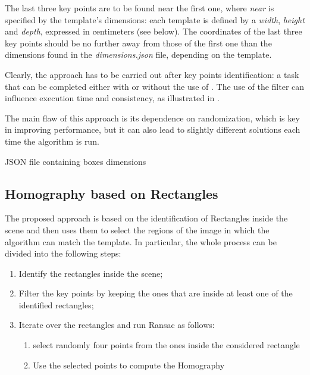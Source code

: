 \documentclass{article}
\newenvironment{code}{\captionsetup{type=listing}}{}
\begin{document}
The last three key points are to be found near the first one, where \textit{near} is specified by the template's dimensions: each template is defined by a \textit{width}, \textit{height} and \textit{depth}, expressed in centimeters (see below). The coordinates of the last three key points should be no further away from those of the first one than the dimensions found in the \textit{dimensions.json} file, depending on the template.

Clearly, the approach has to be carried out after key points identification: a task that can be completed either with or without the use of . The use of the filter can influence execution time and consistency, as illustrated in .

The main flaw of this approach is its dependence on randomization, which is key in improving performance, but it can also lead to slightly different solutions each time the algorithm is run.\\


\begin{code}
    \caption{JSON file containing boxes dimensions}
\end{code}

\subsection{Homography based on Rectangles}
The proposed approach is based on the identification of Rectangles inside the scene and then uses them to select the regions of the image in which the algorithm can match the template. 
In particular, the whole process can be divided into the following steps:
\begin{enumerate}
    \item Identify the rectangles inside the scene;
    \item Filter the key points by keeping the ones that are inside at least one of the identified rectangles; 
    \item Iterate over the rectangles and run Ransac as follows:
    \begin{enumerate}
        \item select randomly four points from the ones inside the considered rectangle
        \item Use the selected points to compute the Homography
    \end{enumerate}   
\end{enumerate}
\end{document}
